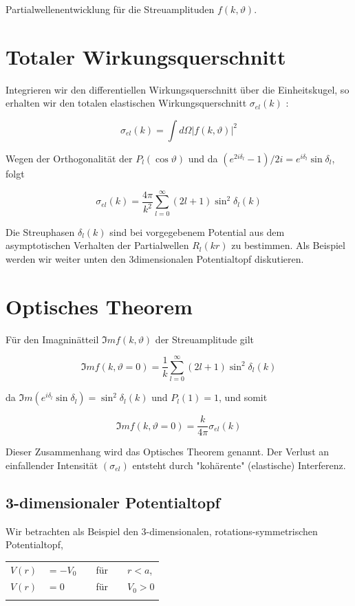 \documentclass[10pt, letterpaper]{article}
\begin{document}
Partialwellenentwicklung für die Streuamplituden $f(k, \vartheta)$.

\section*{Totaler Wirkungsquerschnitt}
Integrieren wir den differentiellen Wirkungsquerschnitt über die Einheitskugel, so erhalten wir den totalen elastischen Wirkungsquerschnitt $\sigma_{e l}(k)$ :

$$
\sigma_{e l}(k)=\int d \Omega|f(k, \vartheta)|^{2}
$$

Wegen der Orthogonalität der $P_{l}(\cos \vartheta)$ und da $\left(e^{2 i \delta_{l}}-1\right) / 2 i=e^{i \delta_{l}} \sin \delta_{l}$, folgt

$$
\sigma_{e l}(k)=\frac{4 \pi}{k^{2}} \sum_{l=0}^{\infty}(2 l+1) \sin ^{2} \delta_{l}(k)
$$

Die Streuphasen $\delta_{l}(k)$ sind bei vorgegebenem Potential aus dem asymptotischen Verhalten der Partialwellen $R_{l}(k r)$ zu bestimmen. Als Beispiel werden wir weiter unten den 3dimensionalen Potentialtopf diskutieren.

\section*{Optisches Theorem}
Für den Imagninätteil $\Im m f(k, \vartheta)$ der Streuamplitude gilt

$$
\Im m f(k, \vartheta=0)=\frac{1}{k} \sum_{l=0}^{\infty}(2 l+1) \sin ^{2} \delta_{l}(k)
$$

da $\Im m\left(e^{i \delta_{l}} \sin \delta_{l}\right)=\sin ^{2} \delta_{l}(k)$ und $P_{l}(1)=1$, und somit

$$
\Im m f(k, \vartheta=0)=\frac{k}{4 \pi} \sigma_{e l}(k)
$$

Dieser Zusammenhang wird das Optisches Theorem genannt. Der Verlust an einfallender Intensität $\left(\sigma_{e l}\right)$ entsteht durch "kohärente" (elastische) Interferenz.

\subsection*{3-dimensionaler Potentialtopf}
Wir betrachten als Beispiel den 3-dimensionalen, rotations-symmetrischen Potentialtopf,

\begin{center}
\begin{tabular}{rlrlrl}
$V(r)$ & $=-V_{0}$ &  & für &  & $r<a$, \\
$V(r)$ & $=0$ &  & für &  & $V_{0}>0$ \\
 &  &  &  &  &  \\
\hline
\end{tabular}
\end{center}
\end{document}
